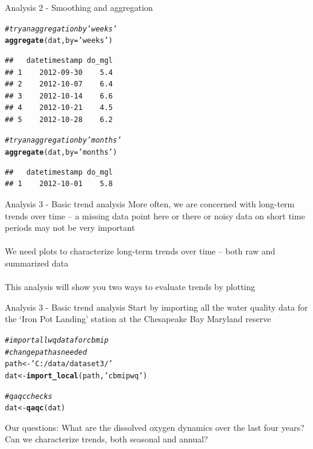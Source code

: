 \documentclass[xcolor=svgnames]{beamer}\usepackage[]{graphicx}\usepackage[]{color}
\makeatletter
\newcommand{\hlstr}[1]{\textcolor[rgb]{0.192,0.494,0.8}{#1}}%
\newcommand{\hlcom}[1]{\textcolor[rgb]{0.678,0.584,0.686}{\textit{#1}}}%
\newcommand{\hlstd}[1]{\textcolor[rgb]{0.345,0.345,0.345}{#1}}%
\newcommand{\hlkwb}[1]{\textcolor[rgb]{0.69,0.353,0.396}{#1}}%
\newcommand{\hlkwc}[1]{\textcolor[rgb]{0.333,0.667,0.333}{#1}}%
\newcommand{\hlkwd}[1]{\textcolor[rgb]{0.737,0.353,0.396}{\textbf{#1}}}%
\newenvironment{kframe}{%
 \def\at@end@of@kframe{}%
 \ifinner\ifhmode%
  \def\at@end@of@kframe{\end{minipage}}%
  \begin{minipage}{\columnwidth}%
 \fi\fi%
 \def\FrameCommand##1{\hskip\@totalleftmargin \hskip-\fboxsep
 \colorbox{shadecolor}{##1}\hskip-\fboxsep
     \hskip-\linewidth \hskip-\@totalleftmargin \hskip\columnwidth}%
 \MakeFramed {\advance\hsize-\width
   \@totalleftmargin\z@ \linewidth\hsize
   \@setminipage}}%
 {\par\unskip\endMakeFramed%
 \at@end@of@kframe}
\newenvironment{knitrout}{}{} %
\makeatother
\begin{document}
\begin{frame}[containsverbatim]{Analysis 2 - Smoothing and aggregation}
\begin{knitrout}\scriptsize
{}\color{fgcolor}\begin{kframe}
\begin{alltt}
\hlcom{# try an aggregation by 'weeks'}
\hlkwd{aggregate}\hlstd{(dat,} \hlkwc{by} \hlstd{=} \hlstr{'weeks'}\hlstd{)}
\end{alltt}
\begin{verbatim}
##   datetimestamp do_mgl
## 1    2012-09-30    5.4
## 2    2012-10-07    6.4
## 3    2012-10-14    6.6
## 4    2012-10-21    4.5
## 5    2012-10-28    6.2
\end{verbatim}
\begin{alltt}
\hlcom{# try an aggregation by 'months'}
\hlkwd{aggregate}\hlstd{(dat,} \hlkwc{by} \hlstd{=} \hlstr{'months'}\hlstd{)}
\end{alltt}
\begin{verbatim}
##   datetimestamp do_mgl
## 1    2012-10-01    5.8
\end{verbatim}
\end{kframe}
\end{knitrout}
\end{frame}

\begin{frame}[containsverbatim]{Analysis 3 - Basic trend analysis}
More often, we are concerned with \alert{long-term trends} over time -- a missing data point here or there or noisy data on short time periods may not be very important \\~\\
We need \alert{plots} to characterize long-term trends over time -- both \alert{raw} and \alert{summarized} data \\~\\
This analysis will show you two ways to evaluate trends by plotting
\end{frame}

\begin{frame}[containsverbatim]{Analysis 3 - Basic trend analysis}
Start by importing all the water quality data for the `Iron Pot Landing' station at the Chesapeake Bay Maryland reserve 

\begin{knitrout}\scriptsize
{}\color{fgcolor}\begin{kframe}
\begin{alltt}
\hlcom{# import all wq data for cbmip}
\hlcom{# change path as needed}
\hlstd{path} \hlkwb{<-} \hlstr{'C:/data/dataset3/'}
\hlstd{dat} \hlkwb{<-} \hlkwd{import_local}\hlstd{(path,} \hlstr{'cbmipwq'}\hlstd{)}

\hlcom{# qaqc checks}
\hlstd{dat} \hlkwb{<-} \hlkwd{qaqc}\hlstd{(dat)}
\end{alltt}
\end{kframe}
\end{knitrout}
\alert{Our questions}: What are the dissolved oxygen dynamics over the last four years?  Can we characterize trends, both seasonal and annual?
\end{frame}
\end{document}
